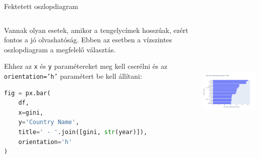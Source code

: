 \documentclass[english, aspectratio=169]{beamer}
\begin{document}
	\begin{frame}[fragile]{Fektetett oszlopdiagram}
		\begin{columns}
			\begin{column}{.5\textwidth}
				Vannak olyan esetek, amikor a tengelycímek hosszúak, ezért fontos a jó olvashatóság. Ebben az esetben a vízszintes oszlopdiagram a megfelelő választás.\par\smallskip
				Ehhez az \texttt{x} és \texttt{y} paramétereket meg kell cserélni és az \texttt{orientation='h'} paramétert be kell állítani:
				\begin{lstlisting}[language=python]
fig = px.bar(
	df, 
	x=gini, 
	y='Country Name', 
	title=' - '.join([gini, str(year)]), 
	orientation='h'
)
				\end{lstlisting}
			\end{column}
			\begin{column}{.5\textwidth}
				\begin{center}
					\includegraphics[width=7cm, height=7cm, keepaspectratio]{images/plots_15.png}
				\end{center}
			\end{column}
		\end{columns}
	\end{frame}
	
\end{document}
